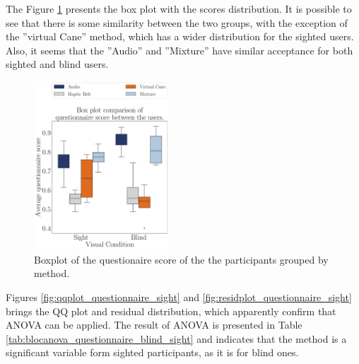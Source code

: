 The Figure \ref{fig:boxplot_questionnaire_scene} presents the box plot with the scores distribution. It is possible to see that there is some similarity between the two groups, with the exception of the ”virtual Cane” method, which has a wider distribution for the sighted users. Also, it seems that the ”Audio” and ”Mixture” have similar acceptance for both sighted and blind users.

\begin{figure}[!htb]
    \centering
    \includegraphics[width = 0.45\textwidth]{Resultados/Questionario/Figuras/pdf/boxplot_questionnaire_scene.pdf}
    \caption{Boxplot of the questionaire score of the the participants grouped by method.}
    \label{fig:boxplot_questionnaire_scene}
\end{figure}

%
%
%

Figures \ref{fig:qqplot_questionnaire_sight} and \ref{fig:residplot_questionnaire_sight} brings the QQ plot and residual distribution, which apparently confirm that ANOVA can be applied. The result of ANOVA is presented in Table \ref{tab:blocanova_questionnaire_blind_sight} and indicates that the method is a significant variable form sighted participants, as it is for blind ones.

